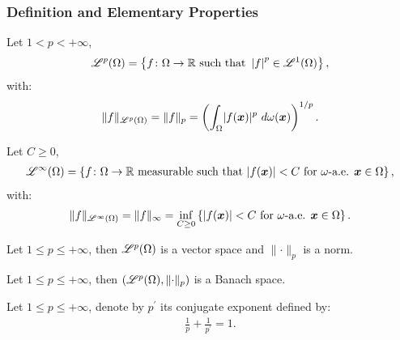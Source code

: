 \subsubsection{Definition and Elementary Properties}

\begin{definition}
    Let $1 < p < +\infty$,
    \begin{align}
        \mathscr{L}^{p}(\Omega) = \left\{ f \colon \Omega \rightarrow \mathbb{R} \text{ such that } \left| f \right|^p \in \mathscr{L}^{1}(\Omega) \right\},
    \end{align}
    with:
    \begin{align}
    \lVert f \rVert_{\mathscr{L}^{p}(\Omega)} = \lVert f \rVert_{p} = \left( \int_{\Omega} \lvert f(\bm{x}) \rvert^p ~ d \omega(\bm{x}) \right)^{1/p}.
    \end{align}
\end{definition}

\begin{definition}[$\SpaceLp{\infty}(\Omega)$]
    Let $C \geq 0$,
    \begin{align}
        \mathscr{L}^{\infty}(\Omega) = \left\{ f \colon \Omega \rightarrow \mathbb{R} \text{ measurable such that } \lvert f(\bm{x}) \rvert < C \text{ for } \omega \text{-a.e. } \bm{x} \in \Omega \right\},
    \end{align}
    with:
    \begin{align}
    \lVert f \rVert_{\mathscr{L}^{\infty}(\Omega)} = \lVert f \rVert_{\infty} = \inf_{C \geq 0} \left\{ \lvert f(\bm{x}) \rvert < C \text{ for } \omega \text{-a.e. } \bm{x} \in \Omega \right\}.
    \end{align}
\end{definition}

\begin{theorem}
    Let $1 \leq p \leq +\infty$, then $\mathscr{L}^{p}(\Omega)$ is a vector space and $\lVert \cdot \rVert_p$ is a norm.
\end{theorem}

\begin{theorem}
    Let $1 \leq p \leq +\infty$, then $(\mathscr{L}^{p}(\Omega), \lVert \cdot \rVert_p)$ is a Banach space.
\end{theorem}

\begin{definition}
    Let $1 \leq p \leq +\infty$, denote by $p^{\prime}$ its conjugate exponent defined by:
    \begin{align}
        \frac{1}{p} + \frac{1}{p^{\prime}} = 1.
    \end{align}
\end{definition}

